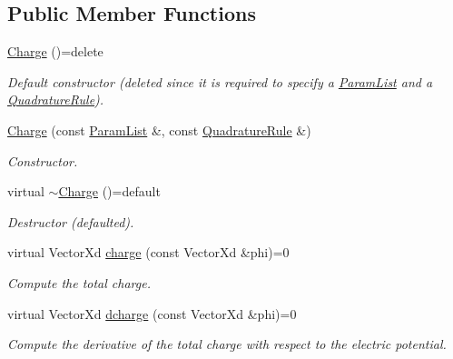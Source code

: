 \subsection*{Public Member Functions}
\begin{DoxyCompactItemize}
\item 
\hypertarget{classCharge_ad8bd7ca1f5eb4af83b0457a01aeeb001}{\hyperlink{classCharge_ad8bd7ca1f5eb4af83b0457a01aeeb001}{Charge} ()=delete}\label{classCharge_ad8bd7ca1f5eb4af83b0457a01aeeb001}

\begin{DoxyCompactList}\small\item\em Default constructor (deleted since it is required to specify a \hyperlink{classParamList}{Param\-List} and a \hyperlink{classQuadratureRule}{Quadrature\-Rule}). \end{DoxyCompactList}\item 
\hyperlink{classCharge_a447211f3a5181d4efb8f2c7f1012c32b}{Charge} (const \hyperlink{classParamList}{Param\-List} \&, const \hyperlink{classQuadratureRule}{Quadrature\-Rule} \&)
\begin{DoxyCompactList}\small\item\em Constructor. \end{DoxyCompactList}\item 
\hypertarget{classCharge_ad350b0cd3356862aacbf538e6cffac61}{virtual \hyperlink{classCharge_ad350b0cd3356862aacbf538e6cffac61}{$\sim$\-Charge} ()=default}\label{classCharge_ad350b0cd3356862aacbf538e6cffac61}

\begin{DoxyCompactList}\small\item\em Destructor (defaulted). \end{DoxyCompactList}\item 
virtual Vector\-Xd \hyperlink{classCharge_ad71141a7a99b0b27493571cb5aa56a0a}{charge} (const Vector\-Xd \&phi)=0
\begin{DoxyCompactList}\small\item\em Compute the total charge. \end{DoxyCompactList}\item 
virtual Vector\-Xd \hyperlink{classCharge_a1e3748286784b1baf022ca8c97fa6ea4}{dcharge} (const Vector\-Xd \&phi)=0
\begin{DoxyCompactList}\small\item\em Compute the derivative of the total charge with respect to the electric potential. \end{DoxyCompactList}\end{DoxyCompactItemize}
